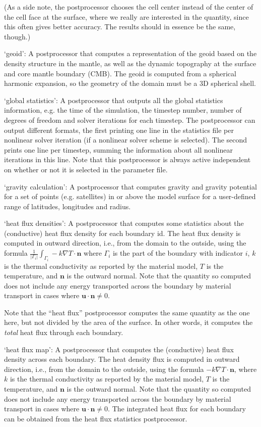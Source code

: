 \begin{itemize}
(As a side note, the postprocessor chooses the cell center instead of the center of the cell face at the surface, where we really are interested in the quantity, since this often gives better accuracy. The results should in essence be the same, though.)

`geoid': A postprocessor that computes a representation of the geoid based on the density structure in the mantle, as well as the dynamic topography at the surface and core mantle boundary (CMB). The geoid is computed from a spherical harmonic expansion, so the geometry of the domain must be a 3D spherical shell.

`global statistics': A postprocessor that outputs all the global statistics information, e.g. the time of the simulation, the timestep number, number of degrees of freedom and solver iterations for each timestep. The postprocessor can output different formats, the first printing one line in the statistics file per nonlinear solver iteration (if a nonlinear solver scheme is selected). The second prints one line per timestep, summing the information about all nonlinear iterations in this line. Note that this postprocessor is always active independent on whether or not it is selected in the parameter file.

`gravity calculation': A postprocessor that computes gravity and gravity potential for a set of points (e.g. satellites) in or above the model surface for a user-defined range of latitudes, longitudes and radius.

`heat flux densities': A postprocessor that computes some statistics about the (conductive) heat flux density for each boundary id. The heat flux density is computed in outward direction, i.e., from the domain to the outside, using the formula $\frac{1}{|\Gamma_i|} \int_{\Gamma_i} -k \nabla T \cdot \mathbf n$ where $\Gamma_i$ is the part of the boundary with indicator $i$, $k$ is the thermal conductivity as reported by the material model, $T$ is the temperature, and $\mathbf n$ is the outward normal. Note that the quantity so computed does not include any energy transported across the boundary by material transport in cases where $\mathbf u \cdot \mathbf n \neq 0$.

Note that the ``heat flux'' postprocessor computes the same quantity as the one here, but not divided by the area of the surface. In other words, it computes the \textit{total} heat flux through each boundary.

`heat flux map': A postprocessor that computes the (conductive) heat flux density across each boundary. The heat density flux is computed in outward direction, i.e., from the domain to the outside, using the formula $-k \nabla T \cdot \mathbf n$, where $k$ is the thermal conductivity as reported by the material model, $T$ is the temperature, and $\mathbf n$ is the outward normal. Note that the quantity so computed does not include any energy transported across the boundary by material transport in cases where $\mathbf u \cdot \mathbf n \neq 0$. The integrated heat flux for each boundary can be obtained from the heat flux statistics postprocessor.


\end{itemize}
